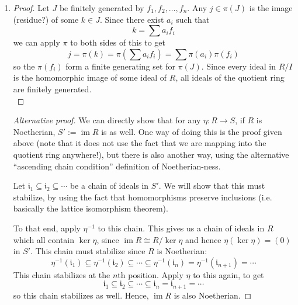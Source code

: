\documentclass{book}
\newcommand{\fr}[1]{\mathfrak #1}
\DeclareMathOperator{\im}{im}
\theoremstyle{definition}
\theoremstyle{block}
\theoremstyle{thm}
\begin{document}
\begin{enumerate}[label=(\alph*)]
      \begin{proof}[Radical ideals]\mbox{}\\*
        $\fr j$ radical $\implies\pi(\fr j)$ radical:\par 
        If $\fr j$ is radical, this means that $\sqrt{\fr j}\subseteq \fr
        j$. (The other direction holds trivially). Since $I\subseteq\fr j$,
        we can apply $\pi$ and use the lattice iso theorem:
        \[\pi(\sqrt{\fr j})=\sqrt{\pi(\fr j)}\subseteq\pi(\fr j),\]
        hence $\pi(\fr j)$ is a radical ideal too.\par
        $\pi(\fr j)$ radical $\implies\fr j$ radical:\par
        The proof of this is just the previous one in reverse, so we omit it.
      \end{proof}
    \item 
      \begin{proof}
        Let $J$ be finitely generated by $f_1,f_2,\ldots,f_n$. Any
        $j\in\pi(J)$ is the image (residue?) of some $k\in J$. Since there exist
        $a_i$ such that
        \[k=\sum a_if_i\]
        we can apply $\pi$ to both sides of this to get
        \[j=\pi(k)=\pi(\sum a_if_i)=\sum\pi(a_i)\pi(f_i)\]
        so the $\pi(f_i)$ form a finite generating set for $\pi(J)$. Since every
        ideal in $R/I$ is the homomorphic image of some ideal of $R$, all ideals
        of the quotient ring are finitely generated.\\
      \end{proof}
      \noindent
      \begin{proof}[Alternative proof]
        We can directly show that for any
        $\eta:R\to S$, if $R$ is Noetherian, $S':=\im R$ is as well. One way of doing this
        is the proof given above (note that it does not use the fact that we are
        mapping into the quotient ring anywhere!), but there is also another way,
        using the alternative ``ascending chain condition'' definition of
        Noetherian-ness.\par
        Let ${\mathfrak i}_1\subseteq {\mathfrak i}_2\subseteq \cdots$ be a chain of ideals in $S'$. We
        will show that this must stabilize, by using the fact that homomorphisms
        preserve inclusions (i.e. basically the lattice isomorphism theorem).\par 
        To that end, apply $\eta^{-1}$ to this chain. This gives us a chain of
        ideals in $R$ which all contain $\ker\eta$, since $\im R\cong R/\ker
        \eta$ and hence $\eta(\ker\eta) = (0)$ in $S'$. 
        This chain must stabilize since $R$ is Noetherian:
        \[\eta^{-1}({\mathfrak i}_1)\subseteq\eta^{-1}({\mathfrak i}_2)
          \subseteq\cdots \subseteq\eta^{-1}({\mathfrak i}_n)=
          \eta^{-1}({\mathfrak i}_{n+1})=\cdots\]
        This chain stabilizes at the $n$th position. Apply $\eta$ to this again,
        to get
        \[{\mathfrak i}_1\subseteq {\mathfrak i}_2\subseteq
          \cdots\subseteq {\mathfrak i}_n={\mathfrak i}_{n+1}=\cdots\]
        so this chain stabilizes as well. Hence, $\im R$ is also Noetherian.
      \end{proof}
  \end{enumerate}
\end{document}
